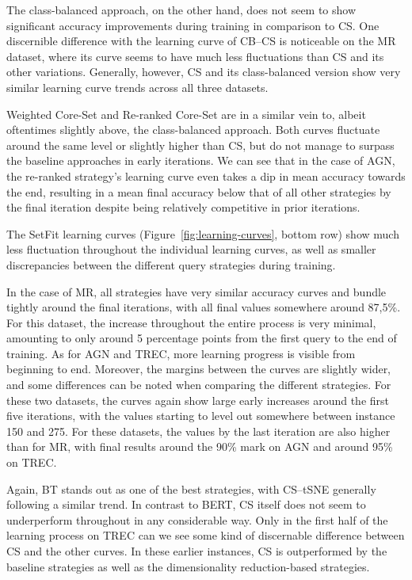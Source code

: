 \documentclass[english,bachelor,ul]{webisthesis} %
\begin{document}
The class-balanced approach, on the other hand, does not seem to show significant accuracy improvements during training in comparison to CS. One discernible difference with the learning curve of CB--CS is noticeable on the MR dataset, where its curve seems to have much less fluctuations than CS and its other variations. Generally, however, CS and its class-balanced version show very similar learning curve trends across all three datasets. 

Weighted Core-Set and Re-ranked Core-Set are in a similar vein to, albeit oftentimes slightly above, the class-balanced approach. Both curves fluctuate around the same level or slightly higher than CS, but do not manage to surpass the baseline approaches in early iterations. We can see that in the case of AGN, the re-ranked strategy's learning curve even takes a dip in mean accuracy towards the end, resulting in a mean final accuracy below that of all other strategies by the final iteration despite being relatively competitive in prior iterations.

The SetFit learning curves (Figure~\ref{fig:learning-curves}, bottom row) show much less fluctuation throughout the individual learning curves, as well as smaller discrepancies between the different query strategies during training. 

In the case of MR, all strategies have very similar accuracy curves and bundle tightly around the final iterations, with all final values somewhere around 87,5\%. For this dataset, the increase throughout the entire process is very minimal, amounting to only around 5 percentage points from the first query to the end of training. As for AGN and TREC, more learning progress is visible from beginning to end. Moreover, the margins between the curves are slightly wider, and some differences can be noted when comparing the different strategies. For these two datasets, the curves again show large early increases around the first five iterations, with the values starting to level out somewhere between instance 150 and 275. For these datasets, the values by the last iteration are also higher than for MR, with final results around the 90\% mark on AGN and around 95\% on TREC.

Again, BT stands out as one of the best strategies, with CS--tSNE generally following a similar trend. In contrast to BERT, CS itself does not seem to underperform throughout in any considerable way. Only in the first half of the learning process on TREC can we see some kind of discernable difference between CS and the other curves. In these earlier instances, CS is outperformed by the baseline strategies as well as the dimensionality reduction-based strategies. 
\end{document}
